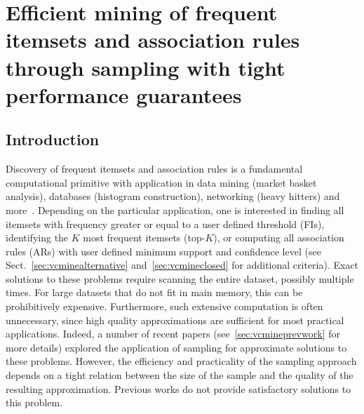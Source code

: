 \chapter{Efficient mining of frequent itemsets and association rules through
sampling with tight performance guarantees}\label{ch:vcmine}

\section{Introduction}\label{sec:vcmineintro}
Discovery of frequent itemsets and association rules is a fundamental
computational primitive with application in data mining (market basket
analysis), databases (histogram construction), networking (heavy hitters) and
more~\cite[Sect.~5]{HanCXY07}. Depending on the particular application, one is
interested in finding all itemsets with frequency greater or equal to a user
defined threshold (FIs), identifying the $K$ most frequent itemsets (top-$K$),
or computing all association rules (ARs) with user defined minimum  support and
confidence level (see Sect.~\ref{sec:vcminealternative} and~\ref{sec:vcmineclosed} for additional criteria). Exact solutions to these problems require scanning the entire
dataset, possibly multiple times. For large datasets that do not fit in main
memory, this can be prohibitively expensive. Furthermore, such extensive
computation is often unnecessary, since high quality approximations are
sufficient for most practical applications.  Indeed, a number of recent
papers (see~\ref{sec:vcmineprevwork} for more details)
explored the application of sampling for approximate solutions to these
problems. However, the efficiency and practicality of the sampling approach
depends on a tight relation between the size of the sample and the quality of
the resulting approximation. Previous works do not provide satisfactory
solutions to this problem.

